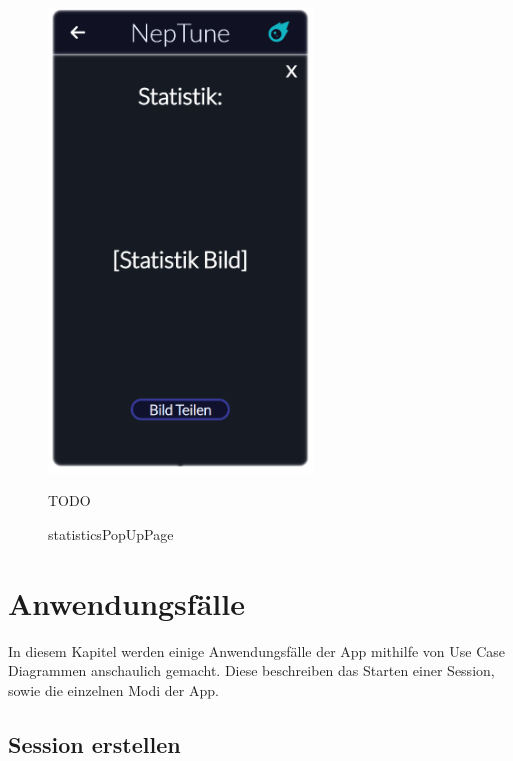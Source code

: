 \documentclass[oneside, ngerman]{sdqtechreport}
\begin{document}
\begin{figure}
    \hypertarget{statisticsPopUpPage}{}
    \begin{minipage}[t]{7 cm}
        \vspace{-1.5ex}
        \includegraphics[width=7cm]{LATEX/Pflichtenheft/GraphicDesigns/statisticsPopUpPage.png}
        \caption{statisticsPopUpPage}
    \end{minipage}
    \hspace{1cm}
    \begin{minipage}[t]{7 cm}
        \vspace{1cm}
        TODO
    \end{minipage}
\end{figure}



\chapter{Anwendungsfälle}
\label{chap:Anwendungsfälle}

In diesem Kapitel werden einige Anwendungsfälle der App mithilfe von Use Case Diagrammen anschaulich gemacht. Diese beschreiben das Starten einer Session, sowie die einzelnen Modi der App.

\section{Session erstellen}
\label{sec:Anwendungsfälle:Session erstellen}
\end{document}
